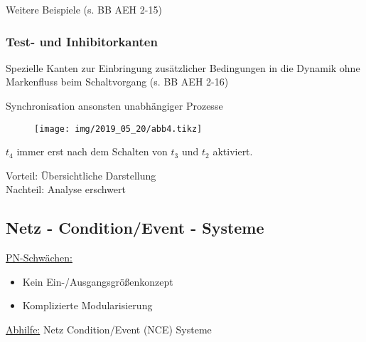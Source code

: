 Weitere Beispiele (s. BB AEH 2-15)

\subsubsection{Test- und Inhibitorkanten}
Spezielle Kanten zur Einbringung zusätzlicher Bedingungen in die Dynamik ohne Markenfluss beim Schaltvorgang (s. BB AEH 2-16)

\beispiel Synchronisation ansonsten unabhängiger Prozesse
\begin{figure}[H]
	\centering
	\texttt{[image: img/2019\_05\_20/abb4.tikz]}
\end{figure}

$t_4$ immer erst nach dem Schalten von $t_3$ und $t_2$ aktiviert.

Vorteil: Übersichtliche Darstellung\\
Nachteil: Analyse erschwert

\subsection{Netz - Condition/Event - Systeme}
\underline{PN-Schwächen:}
\begin{itemize}
	\item Kein Ein-/Ausgangsgrößenkonzept
	\item Komplizierte Modularisierung
\end{itemize}

\underline{Abhilfe:} Netz Condition/Event (NCE) Systeme

